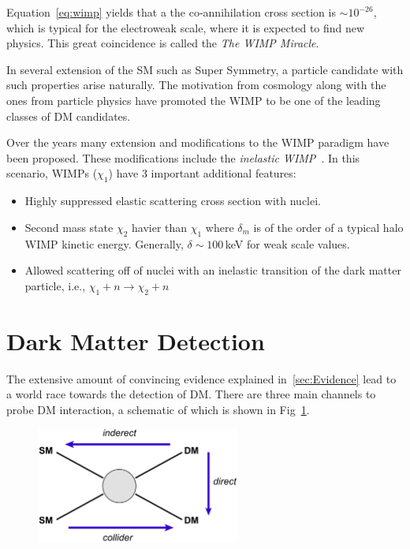 Equation~\ref{eq:wimp} yields that a the co-annihilation cross section is $\sim 10^{-26}$, which is typical for the electroweak scale, where it is expected to find new physics. This great coincidence is called the \textit{The WIMP Miracle}.

In several extension of the SM such as Super Symmetry, a particle candidate with such properties arise naturally. The motivation from cosmology along with the ones from particle physics have promoted the WIMP to be one of the leading classes of DM candidates. 

Over the years many extension and modifications to the WIMP paradigm have been proposed. These modifications include the \textit{inelastic WIMP}~\cite{InelasticIntro}. In this scenario, WIMPs ($\chi_1$) have 3 important additional features:
\begin{itemize}
\item Highly suppressed elastic scattering cross section with nuclei.
\item Second mass state $\chi_2$ havier than $\chi_1$ where $\delta_m$ is of the order of a typical halo WIMP kinetic energy. Generally, $\delta \sim 100$\,keV for weak scale values. 
\item Allowed scattering off of nuclei with an inelastic transition of the dark matter particle, i.e., $\chi_1 + n \rightarrow \chi_2 + n$
\end{itemize}




\section{Dark Matter Detection}
\label{sec:DMDet}

The extensive amount of convincing evidence explained in~\ref{sec:Evidence} lead to a world race towards the detection of DM. There are three main channels to probe DM interaction, a schematic of which is shown in Fig~\ref{fig:detectionScheme}.

\begin{figure}[]
	\centering
	\includegraphics[width=0.6\textwidth]{figs/detection_channels.png}
	\label{fig:detectionScheme}
\end{figure}  

